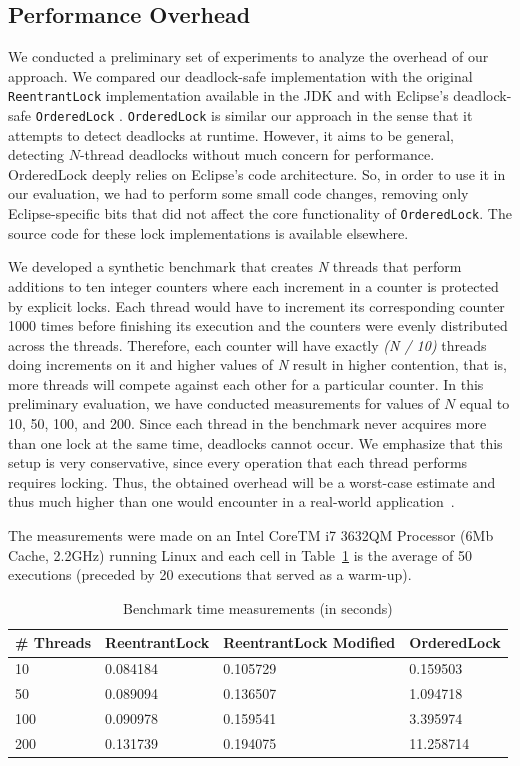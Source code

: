\subsection{Performance Overhead}\label{sec:perf}

We conducted a preliminary set of experiments to analyze the overhead of our approach. We compared our deadlock-safe implementation with the original {\tt ReentrantLock} implementation available in the JDK and with Eclipse's deadlock-safe {\tt OrderedLock} \cite{orderedlock}. {\tt OrderedLock} is similar our approach in the sense that it attempts to detect deadlocks at runtime. However, it aims to be general, detecting $N$-thread deadlocks without much concern for performance. 
OrderedLock deeply relies on Eclipse's code architecture. So, in order to use it in our evaluation, we had to perform some small code changes, removing only Eclipse-specific bits that did not affect the core functionality of {\tt OrderedLock}. The source code for these lock implementations is available elsewhere\cite{repo}.

We developed a synthetic benchmark that creates \emph{N} threads that perform additions to ten integer counters where each increment in a counter is protected by explicit locks. Each thread would have to increment its corresponding counter 1000 times before finishing its execution and the counters were evenly distributed across the threads. Therefore, each counter will have exactly \emph{(N / 10)} threads doing increments on it and higher values of \emph{N} result in higher contention, that is, more threads will compete against each other for a particular counter. In this preliminary evaluation, we have conducted measurements for values of $N$ equal to 10, 50, 100, and 200. Since each thread in the benchmark never acquires more than one lock at the same time, deadlocks cannot occur. We emphasize that this setup is very conservative, since every operation that each thread performs requires locking. Thus, the obtained overhead will be a worst-case estimate and thus much higher than one would encounter in a real-world application~\cite{lozi}. 

The measurements were made on an Intel CoreTM i7 3632QM Processor (6Mb Cache, 2.2GHz) running Linux and each cell in Table~\ref{tab:overhead} is the average of 50 executions (preceded by 20 executions that served as a warm-up). 

\begin{table}
\begin{center}
\caption{Benchmark time measurements (in seconds)}\label{tab:overhead}
\begin{tabular}{|l|l|l|l|}
\hline
\# Threads & ReentrantLock & ReentrantLock Modified & OrderedLock \\
\hline
10 & 0.084184 & 0.105729 & 0.159503\\
50 & 0.089094 & 0.136507 & 1.094718\\
100 & 0.090978 & 0.159541 & 3.395974\\
200 & 0.131739 & 0.194075 & 11.258714\\
\hline
\end{tabular}
\end{center}
\end{table}


